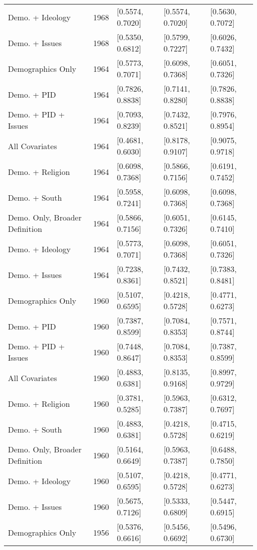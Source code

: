 \begin{longtable}{lrlll}
  Demo. + Ideology & 1968 & [0.5574, 0.7020] & [0.5574, 0.7020] & [0.5630, 0.7072] \\ 
  Demo. + Issues & 1968 & [0.5350, 0.6812] & [0.5799, 0.7227] & [0.6026, 0.7432] \\ 
  Demographics Only & 1964 & [0.5773, 0.7071] & [0.6098, 0.7368] & [0.6051, 0.7326] \\ 
  Demo. + PID & 1964 & [0.7826, 0.8838] & [0.7141, 0.8280] & [0.7826, 0.8838] \\ 
  Demo. + PID + Issues & 1964 & [0.7093, 0.8239] & [0.7432, 0.8521] & [0.7976, 0.8954] \\ 
  All Covariates & 1964 & [0.4681, 0.6030] & [0.8178, 0.9107] & [0.9075, 0.9718] \\ 
  Demo. + Religion & 1964 & [0.6098, 0.7368] & [0.5866, 0.7156] & [0.6191, 0.7452] \\ 
  Demo. + South & 1964 & [0.5958, 0.7241] & [0.6098, 0.7368] & [0.6098, 0.7368] \\ 
  Demo. Only, Broader Definition & 1964 & [0.5866, 0.7156] & [0.6051, 0.7326] & [0.6145, 0.7410] \\ 
  Demo. + Ideology & 1964 & [0.5773, 0.7071] & [0.6098, 0.7368] & [0.6051, 0.7326] \\ 
  Demo. + Issues & 1964 & [0.7238, 0.8361] & [0.7432, 0.8521] & [0.7383, 0.8481] \\ 
  Demographics Only & 1960 & [0.5107, 0.6595] & [0.4218, 0.5728] & [0.4771, 0.6273] \\ 
  Demo. + PID & 1960 & [0.7387, 0.8599] & [0.7084, 0.8353] & [0.7571, 0.8744] \\ 
  Demo. + PID + Issues & 1960 & [0.7448, 0.8647] & [0.7084, 0.8353] & [0.7387, 0.8599] \\ 
  All Covariates & 1960 & [0.4883, 0.6381] & [0.8135, 0.9168] & [0.8997, 0.9729] \\ 
  Demo. + Religion & 1960 & [0.3781, 0.5285] & [0.5963, 0.7387] & [0.6312, 0.7697] \\ 
  Demo. + South & 1960 & [0.4883, 0.6381] & [0.4218, 0.5728] & [0.4715, 0.6219] \\ 
  Demo. Only, Broader Definition & 1960 & [0.5164, 0.6649] & [0.5963, 0.7387] & [0.6488, 0.7850] \\ 
  Demo. + Ideology & 1960 & [0.5107, 0.6595] & [0.4218, 0.5728] & [0.4771, 0.6273] \\ 
  Demo. + Issues & 1960 & [0.5675, 0.7126] & [0.5333, 0.6809] & [0.5447, 0.6915] \\ 
  Demographics Only & 1956 & [0.5376, 0.6616] & [0.5456, 0.6692] & [0.5496, 0.6730] \\ 

\end{longtable}
